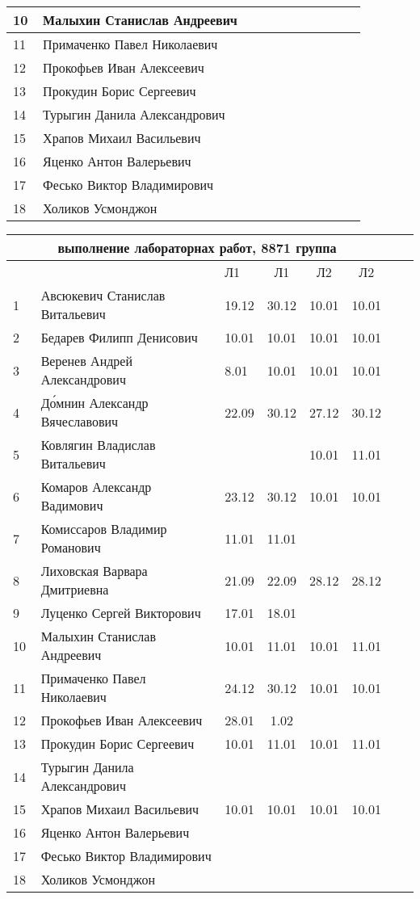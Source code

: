 \documentclass[a4paper,11pt]{article}
\newcommand*\ok{&{\small \ding{51}}} %
\newcommand*\no{&{\small }} %
\begin{document}
\begin{tabular}{p{7pt}|l|p{\CS}|p{\CS}|p{\CS}|p{\CS}|p{\CS}|p{\CS}|p{\CS}|p{\CS}|p{\CS}}
10\,&  Малыхин Станислав Андреевич      \no\no\no&&&&&\\
\midrule
11\,&  Примаченко Павел Николаевич      \no\ok\ok&&&&&\\
12\,&  Прокофьев Иван Алексеевич        \no\no\no&&&&&\\
13\,&  Прокудин Борис Сергеевич         \no\ok\ok&&&&&\\
14\,&  Турыгин Данила Александрович     \no\no\no&&&&\\
15\,&  Храпов Михаил Васильевич         \ok\ok\no&&&&\\
\midrule
16\,&  Яценко Антон Валерьевич          \no\ok\no&&&&&\\
17\,&  Фесько Виктор Владимирович       \no\no\no&&&&&\\
18\,&Холиков Усмонджон                  \no\no\ok&&&&&\\ 
\bottomrule
\end{tabular} 

\newpage
%
\begin{tabular}{l|llc|cccc}
\multicolumn{6}{c}{выполнение лабораторнах работ, 8871 группа} \\
\toprule
&&Л1&Л1& Л2&Л2\\
\midrule
1\,&  Авсюкевич Станислав Витальевич    &19.12& 30.12& 10.01& 10.01\\
2\,&  Бедарев Филипп Денисович          &10.01& 10.01& 10.01& 10.01\\
3\,&  Веренев Андрей Александрович      & 8.01& 10.01& 10.01& 10.01\\
4\,&  Д\'{о}мнин Александр Вячеславович &22.09& 30.12& 27.12& 30.12\\
5\,&   Ковлягин Владислав Витальевич    &     &      & 10.01& 11.01&\\
\midrule
6\,&  Комаров Александр Вадимович       &23.12& 30.12& 10.01& 10.01\\
7\,&  Комиссаров Владимир Романович     &11.01& 11.01&&\\
8\,&  Лиховская Варвара Дмитриевна      &21.09& 22.09& 28.12& 28.12\\
9\,&   Луценко Сергей Викторович        &17.01& 18.01&&\\
10\,&  Малыхин Станислав Андреевич      &10.01& 11.01& 10.01& 11.01\\
\midrule
11\,&  Примаченко Павел Николаевич      &24.12& 30.12& 10.01& 10.01\\
12\,&  Прокофьев Иван Алексеевич        &28.01&  1.02&&\\
13\,&  Прокудин Борис Сергеевич         &10.01& 11.01& 10.01& 11.01\\
14\,&  Турыгин Данила Александрович     &&&\\
15\,&  Храпов Михаил Васильевич         &10.01& 10.01& 10.01& 10.01\\
\midrule
16\,&  Яценко Антон Валерьевич          &&&&\\
17\,&  Фесько Виктор Владимирович       &&&&\\
18\,&Холиков Усмонджон                  &&&&\\
\bottomrule
\end{tabular}
\end{document}
